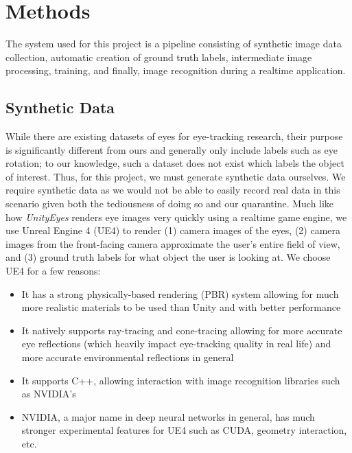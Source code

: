 \vspace{-1em}
\section{Methods}
The system used for this project is a pipeline consisting of synthetic image data collection, automatic creation of ground truth labels, intermediate image processing, training, and finally, image recognition during a realtime application.
\subsection{Synthetic Data}
\vspace{-1em}
While there are existing datasets of eyes for eye-tracking research, their purpose is significantly different from ours and generally only include labels such as eye rotation; to our knowledge, such a dataset does not exist which labels the object of interest. Thus, for this project, we must generate synthetic data ourselves. We require synthetic data as we would not be able to easily record real data in this scenario given both the tediousness of doing so and our quarantine.
\newline\indent Much like how \textit{UnityEyes} renders eye images very quickly using a realtime game engine, we use Unreal Engine 4 (UE4) to render (1) camera images of the eyes, (2) camera images from the front-facing camera approximate the user's entire field of view, and (3) ground truth labels for what object the user is looking at. We choose UE4 for a few reasons:
\begin{itemize}[leftmargin=*,noitemsep]
    \item It has a strong physically-based rendering (PBR) system allowing for much more realistic materials to be used than Unity and with better performance
    \item It natively supports ray-tracing and cone-tracing \cite{???} allowing for more accurate eye reflections (which heavily impact eye-tracking quality in real life) and more accurate environmental reflections in general
    \item It supports C++, allowing interaction with image recognition libraries such as NVIDIA's
    \item NVIDIA, a major name in deep neural networks in general, has much stronger experimental features for UE4 such as CUDA, geometry interaction, etc.
\end{itemize}
